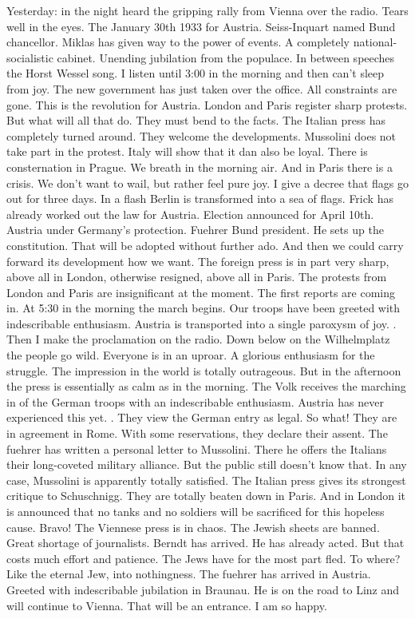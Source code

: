 Yesterday: in the night heard the gripping rally from Vienna over the radio. Tears well in the eyes. The January 30th 1933 for Austria. Seiss-Inquart named Bund chancellor. Miklas has given way to the power of events. A completely national-socialistic cabinet. Unending jubilation from the populace. In between speeches the Horst Wessel song. I listen until 3:00 in the morning and then can't sleep from joy. The new government has just taken over the office. All constraints are gone. This is the revolution for Austria. London and Paris register sharp protests. But what will all that do. They must bend to the facts. The Italian press has completely turned around. They welcome the developments. Mussolini does not take part in the protest. Italy will show that it dan also be loyal. There is consternation in Prague.  We breath in the morning air. \missing And in Paris there is a crisis. We don't want to wail, but rather feel pure joy. I give a decree that flags go out for three days. In a flash Berlin is transformed into a sea of flags. Frick has already worked out the law for Austria. Election announced for April 10th. Austria under Germany's protection. Fuehrer Bund president. He sets up the constitution. That will be adopted without further ado. And then we could carry forward its development how we want. The foreign press is in part very sharp, above all in London, otherwise resigned, above all in Paris. The protests from London and Paris are insignificant at the moment. The first reports are coming in. At 5:30 in the morning the march begins. Our troops have been greeted with indescribable enthusiasm. Austria is transported into a single paroxysm of joy. \missing. Then I make the proclamation on the radio.
Down below on the Wilhelmplatz the people go wild. Everyone is in an uproar. A glorious enthusiasm for the struggle. \missing The impression in the world is totally outrageous. But in the afternoon the press is essentially as calm as in the morning. The Volk receives the marching in of the German troops with an indescribable enthusiasm. Austria has never experienced this yet. . They view the German entry as legal. So what! They are in agreement in Rome. With some reservations, they declare their assent. The fuehrer has written a personal letter to Mussolini. There he offers the Italians their long-coveted military alliance. But the public still doesn't know that. In any case, Mussolini is apparently totally satisfied. The Italian press gives its strongest critique to Schuschnigg. They are totally beaten down in Paris. And in London it is announced that no tanks and no soldiers will be sacrificed for this hopeless cause. Bravo! The Viennese press is in chaos. The Jewish sheets are banned. Great shortage of journalists. Berndt has arrived. He has already acted. But that costs much effort and patience. The Jews have for the most part fled. To where? Like the eternal Jew, into nothingness. The fuehrer has arrived in Austria. Greeted with indescribable jubilation in Braunau. He is on the road to Linz and will continue to Vienna. That will be an entrance. I am so happy.

